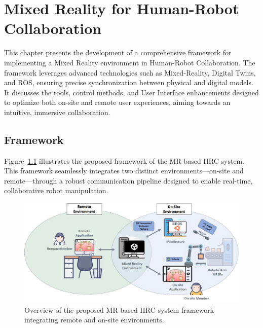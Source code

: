 \chapter{Mixed Reality for Human-Robot Collaboration}%
\label{chapter:on-site}

\begin{introduction}
    This chapter presents the development of a comprehensive framework for implementing a Mixed Reality environment in Human-Robot Collaboration. 
    The framework leverages advanced technologies such as Mixed-Reality, Digital Twins, and ROS, ensuring precise synchronization between physical and digital models. It discusses the tools, control methods, and User Interface enhancements designed to optimize both on-site and remote user experiences, aiming towards an intuitive, immersive collaboration.
\end{introduction}

\section{Framework}

Figure~\ref{fig:project_framework} illustrates the proposed framework of the \ac{MR}-based \ac{HRC} system. This framework seamlessly integrates two distinct environments—on-site and remote—through a robust communication pipeline designed to enable real-time, collaborative robot manipulation.

\begin{figure}[h]
    \centering
    \includegraphics[width=\linewidth]{figs/framework-1.jpeg}
    \caption{Overview of the proposed \ac{MR}-based \ac{HRC} system framework integrating remote and on-site environments.}
    \label{fig:project_framework}
\end{figure}

